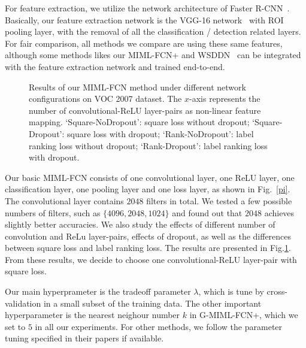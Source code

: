 \documentclass[10pt,twocolumn,letterpaper]{article}
\begin{document}
For feature extraction, we utilize the network architecture of
Faster R-CNN~\cite{Ren2015}. Basically, our feature extraction
network is the VGG-16 network~\cite{Simonyan2014} with ROI pooling
layer, with the removal of all the classification / detection
related layers. For fair comparison, all methods we compare are
using these same features, although some methods likes our
\textsc{MIML-FCN+} and WSDDN~\cite{Bilen2016} can be integrated
with the feature extraction network and trained end-to-end.
\begin{figure}
	\caption{Results of our MIML-FCN method under different network configurations on \textsc{VOC 2007} dataset. The $x$-axis represents the number of convolutional-ReLU layer-pairs as non-linear feature mapping. `Square-NoDropout': square loss without dropout; `Square-Dropout': square loss with dropout; `Rank-NoDropout': label ranking loss without dropout; `Rank-Dropout': label ranking loss with dropout.}
	\label{val}
\end{figure}

Our basic MIML-FCN consists of one convolutional layer, one ReLU
layer, one classification layer, one pooling layer and one loss
layer, as shown in Fig.~\ref{pi}. The convolutional layer contains
$2048$ filters in total. We tested a few possible numbers of filters, such as $\{4096,2048,1024\}$ and found out that $2048$ achieves slightly better accuracies. We also study the effects of different number
of convolution and ReLu layer-pairs, effects of dropout, as well
as the differences between square loss and label ranking loss. The
results are presented in Fig.\ref{val}. From these results, we
decide to choose one convolutional-ReLU layer-pair with square
loss.


Our main hyperprameter is the tradeoff parameter $\lambda$, which
is tune by cross-validation in a small subset of the training
data. The other important hyperparameter is the nearest neighour
number $k$ in \textsc{G-MIML-FCN+}, which we set to $5$ in all our
experiments. For other methods, we follow the parameter tuning
specified in their papers if available.
\end{document}
